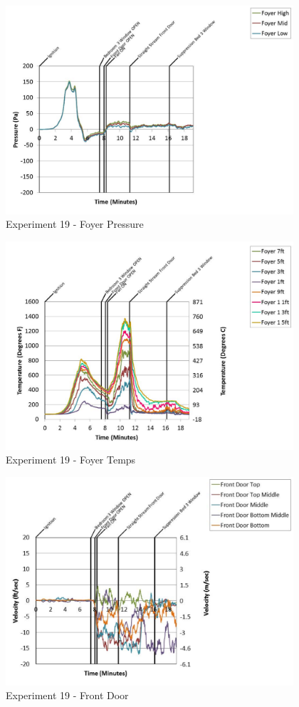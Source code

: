\documentclass{article}
\begin{document}
\begin{appendices}
	\begin{figure}[h!]
		\centering
		\includegraphics[height=3.05in]{0_Images/Results_Charts/Exp_19_Charts/FoyerPressure.pdf}
		\caption{Experiment 19 - Foyer Pressure}
	\end{figure}
 
	\clearpage

	\begin{figure}[h!]
		\centering
		\includegraphics[height=3.05in]{0_Images/Results_Charts/Exp_19_Charts/FoyerTemps.pdf}
		\caption{Experiment 19 - Foyer Temps}
	\end{figure}
 

	\begin{figure}[h!]
		\centering
		\includegraphics[height=3.05in]{0_Images/Results_Charts/Exp_19_Charts/FrontDoor.pdf}
		\caption{Experiment 19 - Front Door}
	\end{figure}
 

\end{appendices}
\end{document}
